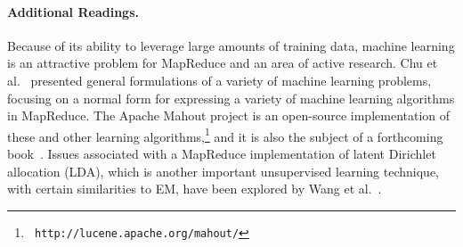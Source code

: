\paragraph{Additional Readings.}
Because of its ability to leverage large amounts of training data,
machine learning is an attractive problem for MapReduce and an area of
active research.  Chu et al.~\cite{ChuCT_etal_2006} presented general
formulations of a variety of machine learning problems, focusing on a
normal form for expressing a variety of machine learning algorithms in
MapReduce.  The Apache Mahout project is an open-source implementation
of these and other learning algorithms,\footnote{\texttt{
  http://lucene.apache.org/mahout/}} and it is also the subject of a
forthcoming book~\cite{Owen_2010}.  Issues associated with a MapReduce
implementation of latent Dirichlet allocation (LDA), which is another
important unsupervised learning technique, with certain similarities
to EM, have been explored by Wang et al.~\cite{WangYi_etal_2009}.
